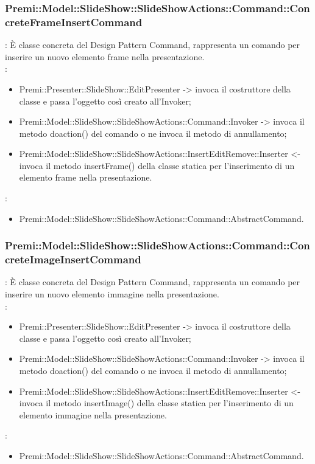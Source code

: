 {                    \subsubsection{Premi::Model::SlideShow::SlideShowActions::Command::ConcreteFrameInsertCommand}{
				\textbf{\tipo}: È classe concreta del Design Pattern Command, rappresenta un comando per inserire un nuovo elemento frame nella presentazione.\\	
				\textbf{\relaz}: 
				\begin{itemize}
					\item Premi::Presenter::SlideShow::EditPresenter -> invoca il costruttore della classe e passa l’oggetto così creato all’Invoker;
					\item Premi::Model::SlideShow::SlideShowActions::Command::Invoker -> invoca il metodo doaction() del comando o ne invoca il metodo di annullamento;
                    \item Premi::Model::SlideShow::SlideShowActions::InsertEditRemove::Inserter <- invoca il metodo insertFrame() della classe statica per l’inserimento di un elemento frame nella presentazione.
				\end{itemize}	
                \textbf{\base}: 
                    \begin{itemize}
                    \item Premi::Model::SlideShow::SlideShowActions::Command::AbstractCommand.
                    \end{itemize}
                    }
                    \subsubsection{Premi::Model::SlideShow::SlideShowActions::Command::ConcreteImageInsertCommand}{
				\textbf{\tipo}: È classe concreta del Design Pattern Command, rappresenta un comando per inserire un nuovo elemento immagine nella presentazione.\\	
				\textbf{\relaz}: 
				\begin{itemize}
					\item Premi::Presenter::SlideShow::EditPresenter -> invoca il costruttore della classe e passa l’oggetto così creato all’Invoker;
					\item Premi::Model::SlideShow::SlideShowActions::Command::Invoker -> invoca il metodo doaction() del comando o ne invoca il metodo di annullamento;
                    \item Premi::Model::SlideShow::SlideShowActions::InsertEditRemove::Inserter <- invoca il metodo insertImage() della classe statica per l’inserimento di un elemento immagine nella presentazione.
				\end{itemize}	
                \textbf{\base}: 
                    \begin{itemize}
                    \item Premi::Model::SlideShow::SlideShowActions::Command::AbstractCommand.
                    \end{itemize}
                    }
}
